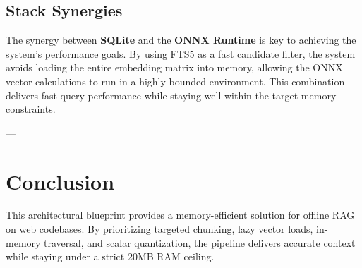 \documentclass[11pt,a4paper]{article}
\begin{document}
\subsection{Stack Synergies}
The synergy between \textbf{SQLite} and the \textbf{ONNX Runtime} is key to achieving the system's performance goals. By using FTS5 as a fast candidate filter, the system avoids loading the entire embedding matrix into memory, allowing the ONNX vector calculations to run in a highly bounded environment. This combination delivers fast query performance while staying well within the target memory constraints.

---

\section{Conclusion}
This architectural blueprint provides a memory-efficient solution for offline RAG on web codebases. By prioritizing targeted chunking, lazy vector loads, in-memory traversal, and scalar quantization, the pipeline delivers accurate context while staying under a strict 20MB RAM ceiling.
\end{document}
